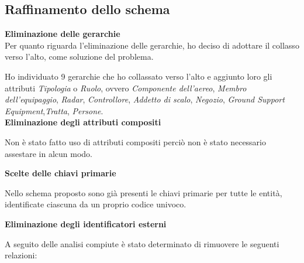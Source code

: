 \newpage

\subsection{Raffinamento dello schema}

\textbf{Eliminazione delle gerarchie}\\
\textsf{\small Per quanto riguarda l'eliminazione delle gerarchie, ho deciso di adottare il collasso verso l'alto, come soluzione del problema.}\break 



\textsf{\small Ho individuato 9 gerarchie che ho collassato verso l'alto e aggiunto loro gli attributi \emph{Tipologia} o \emph{Ruolo}, ovvero \emph{Componente dell'aereo}, \emph{Membro dell'equipaggio}, \emph{Radar}, \emph{Controllore}, \emph{Addetto di scalo}, \emph{Negozio}, \emph{Ground Support Equipment},\emph{Tratta}, \emph{Persone}.}\\

\textbf{Eliminazione degli attributi compositi}

\textsf{\small Non è stato fatto uso di attributi compositi perciò non è stato necessario assestare in alcun modo.}\break %

\textbf{Scelte delle chiavi primarie}

\textsf{\small Nello schema proposto sono già presenti le chiavi primarie per tutte le entità, identificate ciascuna da un proprio codice univoco.}\break

\textbf{Eliminazione degli identificatori esterni}

\textsf{\small A seguito delle analisi compiute è stato determinato di rimuovere le seguenti relazioni:}\\ %


